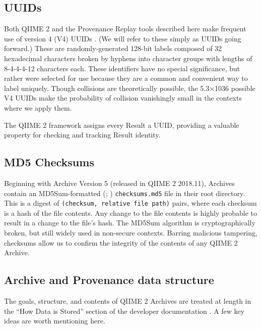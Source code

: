 \subsection{UUIDs}

Both QIIME 2 and the Provenance Replay tools described here make frequent use of
version 4 (V4) UUIDs \parencite{leach_universally_2005}.
(We will refer to these simply as UUIDs going forward.)
These are randomly-generated 128-bit labels composed of 32 hexadecimal
characters broken by hyphens into character groups with lengths of 8-4-4-4-12
characters each. These identifiers have no special significance, but rather were
selected for use because they are a common and convenient way to label uniquely.
Though collisions are theoretically possible, the 5.3×1036 possible V4 UUIDs
make the probability of collision vanishingly small in the contexts where we
apply them.

The QIIME 2 framework assigns every Result a UUID, providing a valuable property
for checking and tracking Result identity. 

\subsection{MD5 Checksums}

Beginning with Archive Version 5 (released in QIIME 2 2018.11), Archives contain
an MD5Sum-formatted (\cite{rivest_md5_1992}; \cite{ulrich_drepper_md5sum1_2010})
\texttt{checksums.md5} file in their root directory. This is a digest of \texttt{(checksum, relative file path)}
pairs, where each checksum is a hash of the file contents.
Any change to the file contents is highly probable to result in a change to the
file’s hash. The MD5Sum algorithm is cryptographically broken, but still widely
used in non-secure contexts. Barring malicious tampering, checksums allow us to
confirm the integrity of the contents of any QIIME 2 Archive.

\subsection{Archive and Provenance data structure}
The goals, structure, and contents of QIIME 2 Archives are treated at length in
the “How Data is Stored” section of the developer documentation \parencite{qiime_2_development_team_how_2018}.
A few key ideas are worth mentioning here.

